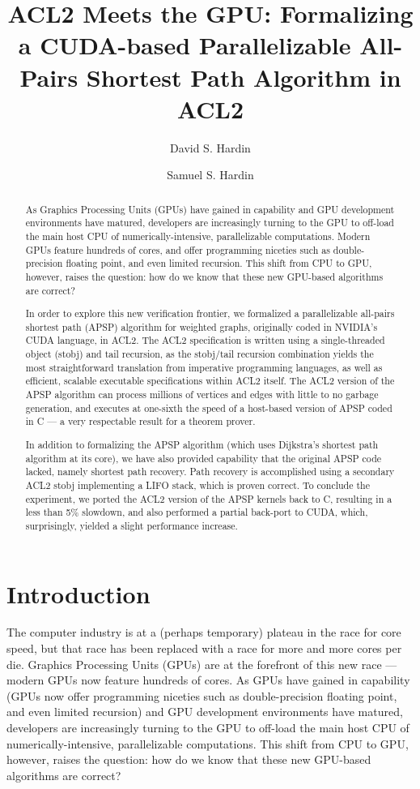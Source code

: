 \documentclass[copyright]{eptcs}
\title{ACL2 Meets the GPU: Formalizing a CUDA-based Parallelizable All-Pairs Shortest Path Algorithm in ACL2}
\author{David S. Hardin
\institute{Advanced Technology Center\\ Rockwell Collins\\
Cedar Rapids, IA, USA}
\email{dshardin@rockwellcollins.com}
\and
Samuel S. Hardin
\institute{Department of Electrical and Computer Engineering\\Iowa State University\\
Ames, IA, USA}
\email{sshardin@iastate.edu}
}
\begin{document}
\maketitle

\begin{abstract}
As Graphics Processing Units (GPUs) have gained in capability and
GPU development environments have matured, developers are 
increasingly turning to the GPU to off-load the main host CPU of  
numerically-intensive, parallelizable computations.  Modern
GPUs feature hundreds of cores, and offer programming niceties such as 
double-precision floating point, and even limited recursion.  This 
shift from CPU to GPU, however, raises the question: how do we know that 
these new GPU-based algorithms are correct?

In order to explore this new verification frontier, we formalized 
a parallelizable all-pairs shortest path (APSP) algorithm for
weighted graphs, originally coded in NVIDIA's CUDA
language, in ACL2.  The ACL2 specification is written using a 
single-threaded object (stobj) and tail recursion, as the stobj/tail
recursion combination yields the most straightforward translation 
from imperative programming languages, as well as efficient, 
scalable executable specifications within ACL2 itself.  The ACL2 
version of the APSP algorithm can process millions of vertices and edges  
with little to no garbage generation, and executes at one-sixth 
the speed of a host-based version of APSP coded in C --- 
a very respectable result for a theorem prover.

In addition to formalizing the APSP algorithm (which uses Dijkstra's
shortest path algorithm at its core), we have also provided capability 
that the original APSP code lacked, namely shortest path recovery.
Path recovery is accomplished using a secondary ACL2 stobj
implementing a LIFO stack, which is proven correct.  To conclude the
experiment, we ported the ACL2 version of the APSP kernels 
back to C, resulting in a less than 5\% slowdown, 
and also performed a partial back-port to CUDA, which, 
surprisingly, yielded a slight performance increase.
\end{abstract}

\section{Introduction}\label{intro}
The computer industry is at a (perhaps temporary) plateau in the race
for core speed, but that race has been replaced with a race for more and 
more cores per die.  Graphics Processing Units (GPUs) are at the
forefront of this new race --- modern GPUs now feature hundreds of
cores.  As GPUs have gained in capability (GPUs now offer programming 
niceties such as double-precision floating point, and even limited
recursion) and GPU development environments have matured, developers
are increasingly turning to the GPU to off-load the main host CPU of 
numerically-intensive, parallelizable computations.   This 
shift from CPU to GPU, however, raises the question: how do we know that 
these new GPU-based algorithms are correct?
\end{document}
